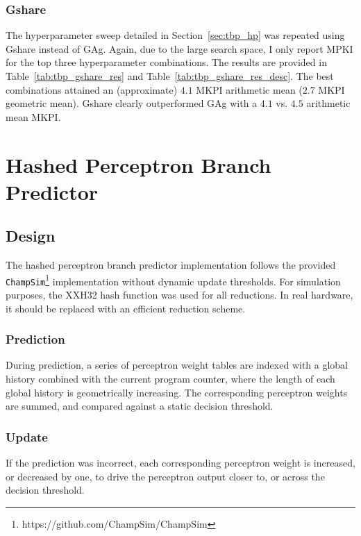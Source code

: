 \documentclass{article}
\begin{document}
\subsubsection{Gshare}

The hyperparameter sweep detailed in Section~\ref{sec:tbp_hp} was repeated using Gshare instead of GAg. Again, due to the large search space, I only report 
MPKI for the top three hyperparameter combinations. The results are provided in Table~\ref{tab:tbp_gshare_res} and Table~\ref{tab:tbp_gshare_res_desc}. The best
combinations attained an (approximate) $4.1$ MKPI arithmetic mean ($2.7$ MKPI geometric mean). Gshare clearly outperformed GAg with a $4.1$ vs. $4.5$ arithmetic
mean MKPI.

\section{Hashed Perceptron Branch Predictor}

\subsection{Design}

The hashed perceptron branch predictor implementation follows the provided \texttt{ChampSim}\footnote{https://github.com/ChampSim/ChampSim} implementation 
without dynamic update thresholds. For simulation purposes, the XXH32 hash function was used for all reductions. In real hardware, it should be replaced with an
efficient reduction scheme.

\subsubsection{Prediction}

During prediction, a series of perceptron weight tables are indexed with a global history combined with the current program counter, where the length of each 
global history is geometrically increasing. The corresponding perceptron weights are summed, and compared against a static decision threshold. 

\subsubsection{Update}

If the prediction was incorrect, each corresponding perceptron weight is increased, or decreased by one, to drive the perceptron output closer to, or across the
decision threshold.
\end{document}
